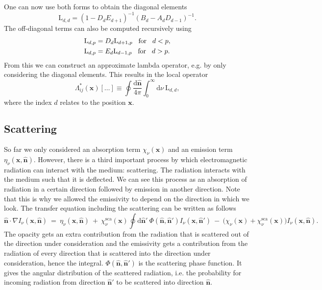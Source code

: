 \documentclass[]{article}
\newcommand{\D}{\text{d}}
\begin{document}
One can now use both forms to obtain the diagonal elements
\begin{equation}
\text{L}_{d,d} =  \left(1-D_{d}E_{d+1}\right)^{-1}\left( B_{d} - A_{d} D_{d-1} \right)^{-1}.
\end{equation}
The off-diagonal terms can also be computed recursively using
\begin{equation}
\begin{split}
\text{L}_{d,p} &= D_{d} \text{L}_{d+1,p} \hspace{3mm} \text{for} \hspace{3mm} d<p, \\
\text{L}_{d,p} &= E_{d} \text{L}_{d-1,p} \hspace{3mm} \text{for} \hspace{3mm} d>p. \\
\end{split}
\end{equation}
From this we can construct an approximate lambda operator, e.g. by only considering the diagonal elements. This results in the local operator
\begin{equation}
\Lambda^{\ast}_{ij}(\textbf{x})[\ldots] \equiv \oint \frac{\D \hat{\textbf{n}}}{4 \pi} \int_{0}^{\infty} \D \nu \ \text{L}_{d,d},
\end{equation}
where the index $d$ relates to the position $\textbf{x}$.


\subsection{Scattering}

So far we only considered an absorption term $\chi_{\nu}(\textbf{x})$ and an emission term $\eta_{\nu}(\textbf{x},\hat{\textbf{n}})$. However, there is a third important process by which electromagnetic radiation can interact with the medium: scattering. The radiation interacts with the medium such that it is deflected. We can see this process as an absorption of radiation in a certain direction followed by emission in another direction. Note that this is why we allowed the emissivity to depend on the direction in which we look. The transfer equation including the scattering can be written as follows
\begin{equation}
\hat{\textbf{n}} \cdot \nabla I_{\nu}(\textbf{x},\hat{\textbf{n}}) \ = \ \eta_{\nu}(\textbf{x},\hat{\textbf{n}}) \ + \ \chi_{\nu}^{\text{sca}}(\textbf{x}) \oint \D \hat{\textbf{n}}' \ \Phi(\hat{\textbf{n}},\hat{\textbf{n}}') I_{\nu}(\textbf{x},\hat{\textbf{n}}') \ - \ \big( \chi_{\nu}(\textbf{x}) + \chi_{\nu}^{\text{sca}}(\textbf{x}) \big) I_{\nu}(\textbf{x},\hat{\textbf{n}}).
\label{RTEscat}
\end{equation}
The opacity gets an extra contribution from the radiation that is scattered out of the direction under consideration and the emissivity gets a contribution from the radiation of every direction that is scattered into the direction under consideration, hence the integral. $\Phi(\hat{\textbf{n}},\hat{\textbf{n}}')$ is the scattering phase function. It gives the angular distribution of the scattered radiation, i.e. the probability for incoming radiation from direction $\hat{\textbf{n}}'$ to be scattered into direction $\hat{\textbf{n}}$.
\end{document}
